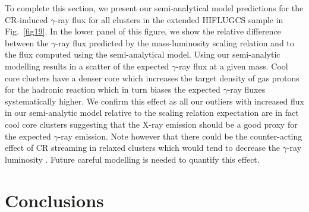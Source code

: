 \documentclass[10pt,aps,pra,reprint,amsmath,amsfonts,amssymb,showpacs]{revtex4-1}
\def\del#1{{}}
\newcommand{\rmn}{\mathrm}
\newcommand{\tev}{\rmn{TeV}}
\newcommand{\e}{\rmn{e}}
\newcommand{\eg}{E_\gamma}
\begin{document}
To complete this section, we present our semi-analytical model predictions for
the CR-induced $\gamma$-ray flux for all clusters in the extended HIFLUGCS
sample in Fig.~\ref{fig19}. In the lower panel of this figure, we show the
relative difference between the $\gamma$-ray flux predicted by the
mass-luminosity scaling relation and to the flux computed using the
semi-analytical model. Using our semi-analytic modelling results in a scatter of
the expected $\gamma$-ray flux at a given mass. Cool core clusters have a denser
core which increases the target density of gas protons for the hadronic reaction
which in turn biases the expected $\gamma$-ray fluxes systematically higher. We
confirm this effect as all our outliers with increased flux in our semi-analytic
model relative to the scaling relation expectation are in fact cool core
clusters suggesting that the X-ray emission should be a good proxy for the
expected $\gamma$-ray emission. Note however that there could be the
counter-acting effect of CR streaming in relaxed clusters which would tend to
decrease the $\gamma$-ray luminosity \cite{2011A&A...527A..99E}. Future careful
modelling is needed to quantify this effect.


\del{
ANDERS: do you need this?
--) The dust turns up at about a factor 100 lower than the stars
--) The other figure show the spectral shape of the IC-star with the same
spectral shape as the dust, it shows the same gamma-ray slope as the dust
--) The reason why there is only a factor 10 difference in the break in the
gamma-ray emission between the star and dust is related to the KN. In our CRp
paper, the last figure shows that at $\eg=100\,\tev$, the spectra is suppressed
with about a factor 10 (also depends on $\alpha_\e$). Since the dust photons
have a factor 10 higher energy, I expect this suppression at about 10~TeV. For
star photons the suppression should be at 100~GeV. So the star photons are
definitely KN suppressed, which explains the earlier break and the steeper
slope.
}


%



\section{Conclusions}
\end{document}
